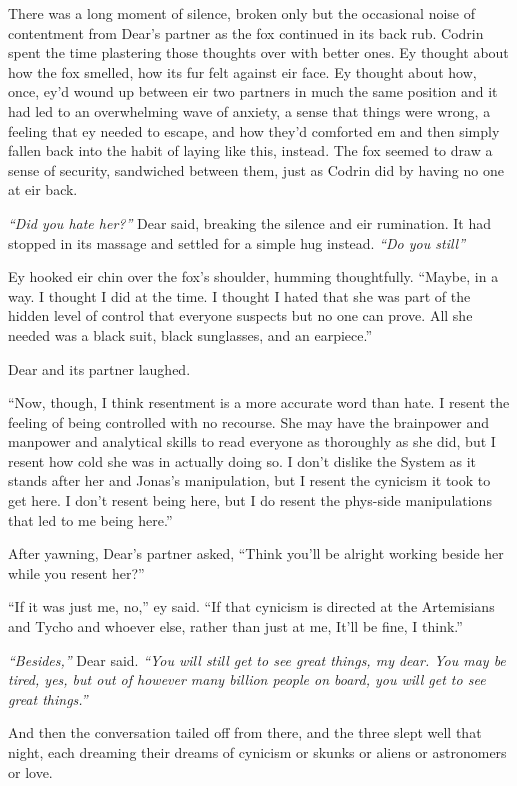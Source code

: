 There was a long moment of silence, broken only but the occasional noise of contentment from Dear's partner as the fox continued in its back rub. Codrin spent the time plastering those thoughts over with better ones. Ey thought about how the fox smelled, how its fur felt against eir face. Ey thought about how, once, ey'd wound up between eir two partners in much the same position and it had led to an overwhelming wave of anxiety, a sense that things were wrong, a feeling that ey needed to escape, and how they'd comforted em and then simply fallen back into the habit of laying like this, instead. The fox seemed to draw a sense of security, sandwiched between them, just as Codrin did by having no one at eir back.

\emph{``Did you hate her?''} Dear said, breaking the silence and eir rumination. It had stopped in its massage and settled for a simple hug instead. \emph{``Do you still''}

Ey hooked eir chin over the fox's shoulder, humming thoughtfully. ``Maybe, in a way. I thought I did at the time. I thought I hated that she was part of the hidden level of control that everyone suspects but no one can prove. All she needed was a black suit, black sunglasses, and an earpiece.''

Dear and its partner laughed.

``Now, though, I think resentment is a more accurate word than hate. I resent the feeling of being controlled with no recourse. She may have the brainpower and manpower and analytical skills to read everyone as thoroughly as she did, but I resent how cold she was in actually doing so. I don't dislike the System as it stands after her and Jonas's manipulation, but I resent the cynicism it took to get here. I don't resent being here, but I do resent the phys-side manipulations that led to me being here.''

After yawning, Dear's partner asked, ``Think you'll be alright working beside her while you resent her?''

``If it was just me, no,'' ey said. ``If that cynicism is directed at the Artemisians and Tycho and whoever else, rather than just at me, It'll be fine, I think.''

\emph{``Besides,''} Dear said. \emph{``You will still get to see great things, my dear. You may be tired, yes, but out of however many billion people on board, you will get to see great things.''}

And then the conversation tailed off from there, and the three slept well that night, each dreaming their dreams of cynicism or skunks or aliens or astronomers or love.

